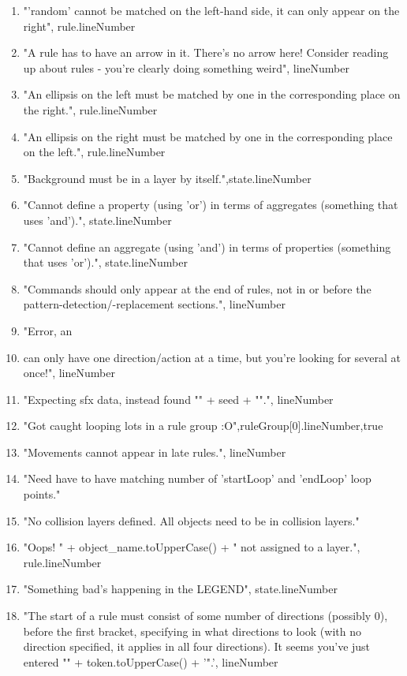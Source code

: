 \begin{enumerate}
    \item "'random' cannot be matched on the left-hand side, it can only appear on the right", rule.lineNumber
    \item "A rule has to have an arrow in it.  There's no arrow here! Consider reading up about rules - you're clearly doing something weird", lineNumber
    \item "An ellipsis on the left must be matched by one in the corresponding place on the right.", rule.lineNumber
    \item "An ellipsis on the right must be matched by one in the corresponding place on the left.", rule.lineNumber
    \item "Background must be in a layer by itself.",state.lineNumber
    \item "Cannot define a property (using 'or') in terms of aggregates (something that uses 'and').", state.lineNumber
    \item "Cannot define an aggregate (using 'and') in terms of properties (something that uses 'or').", state.lineNumber
    \item "Commands should only appear at the end of rules, not in or before the pattern-detection/-replacement sections.", lineNumber
    \item "Error, an \item can only have one direction/action at a time, but you're looking for several at once!", lineNumber
    \item "Expecting sfx data, instead found "" + seed + "".", lineNumber
    \item "Got caught looping lots in a rule group :O",ruleGroup[0].lineNumber,true
    \item "Movements cannot appear in late rules.", lineNumber
    \item "Need have to have matching number of  'startLoop' and 'endLoop' loop points."
    \item "No collision layers defined.  All objects need to be in collision layers."
    \item "Oops!  " + object\_name.toUpperCase() + " not assigned to a layer.", rule.lineNumber
    \item "Something bad's happening in the LEGEND", state.lineNumber
    \item "The start of a rule must consist of some number of directions (possibly 0), before the first bracket, specifying in what directions to look (with no direction specified, it applies in all four directions).  It seems you've just entered "" + token.toUpperCase() + '".', lineNumber

\end{enumerate}
